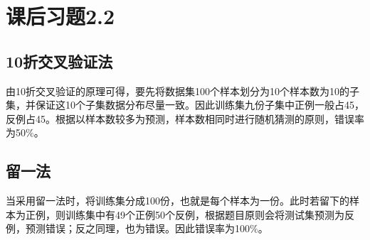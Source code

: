 \documentclass{article}
\begin{document}
\section{课后习题2.2}
\subsection{10折交叉验证法}
由10折交叉验证的原理可得，要先将数据集100个样本划分为10个样本数为10的子集，并保证这10个子集数据分布尽量一致。因此训练集九份子集中正例一般占45，反例占45。根据以样本数较多为预测，样本数相同时进行随机猜测的原则，错误率为50$\%$。
\subsection{留一法}
当采用留一法时，将训练集分成100份，也就是每个样本为一份。此时若留下的样本为正例，则训练集中有49个正例50个反例，根据题目原则会将测试集预测为反例，预测错误；反之同理，也为错误。因此错误率为100$\%$。

%
\end{document}
